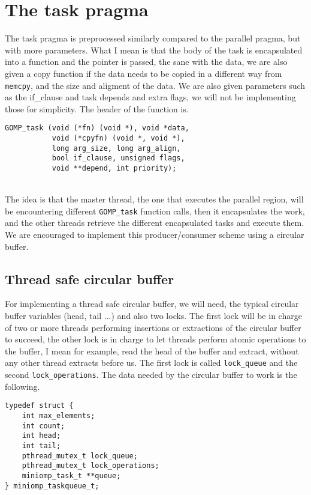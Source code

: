 \section{The task pragma}
The task pragma is preprocessed similarly compared to the parallel pragma, but with more parameters. What I mean is that the body of the task is encapsulated into a function and the pointer is passed, the sane with the data, we are also given a copy function if the data needs to be copied in a different way from \texttt{memcpy}, and the size and aligment of the data. We are also given parameters such as the if\_clause and task depends and extra flags, we will not be implementing those for simplicity. The header of the function is.

\begin{lstlisting}[caption=Header for GOMP\_task function, label=GOMPtask]
GOMP_task (void (*fn) (void *), void *data,
           void (*cpyfn) (void *, void *),
           long arg_size, long arg_align,
           bool if_clause, unsigned flags,
           void **depend, int priority);
\end{lstlisting}

\par ~\\
The idea is that the master thread, the one that executes the parallel region, will be encountering different \texttt{GOMP\_task} function calls, then it encapsulates the work, and the other threads retrieve the different encapsulated tasks and execute them. We are encouraged to implement this producer/consumer scheme using a circular buffer. 

\subsection{Thread safe circular buffer}

For implementing a thread safe circular buffer, we will need, the typical circular buffer variables (head, tail ...) and also two locks. The first lock will be in charge of two or more threads performing insertions or extractions of the circular buffer to succeed, the other lock is in charge to let threads perform atomic operations to the buffer, I mean for example, read the head of the buffer and extract, without any other thread extracts before us. The first lock is called \texttt{lock\_queue} and the second \texttt{lock\_operations}. The data needed by the circular buffer to work is the following.

\begin{lstlisting}[caption=Circular buffer declaration, label=cbuffer]
typedef struct {
    int max_elements;
    int count;
    int head;
    int tail;
    pthread_mutex_t lock_queue;
    pthread_mutex_t lock_operations;
    miniomp_task_t **queue;
} miniomp_taskqueue_t;

\end{lstlisting}

